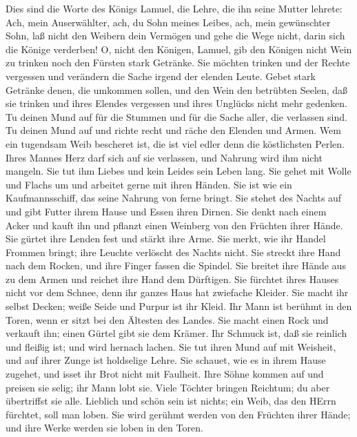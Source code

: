  Dies sind die Worte des Königs Lamuel, die Lehre, die ihn
seine Mutter lehrete:  Ach, mein Auserwählter, ach, du Sohn
meines Leibes, ach, mein gewünschter Sohn,  laß nicht den
Weibern dein Vermögen und gehe die Wege nicht, darin sich die Könige
verderben!  O, nicht den Königen, Lamuel, gib den Königen
nicht Wein zu trinken noch den Fürsten stark Getränke.  Sie
möchten trinken und der Rechte vergessen und verändern die Sache irgend
der elenden Leute.  Gebet stark Getränke denen, die umkommen
sollen, und den Wein den betrübten Seelen,  daß sie trinken
und ihres Elendes vergessen und ihres Unglücks nicht mehr gedenken.
 Tu deinen Mund auf für die Stummen und für die Sache aller,
die verlassen sind.  Tu deinen Mund auf und richte recht und
räche den Elenden und Armen.  Wem ein tugendsam Weib
bescheret ist, die ist viel edler denn die köstlichsten Perlen.
 Ihres Mannes Herz darf sich auf sie verlassen, und Nahrung
wird ihm nicht mangeln.  Sie tut ihm Liebes und kein Leides
sein Leben lang.  Sie gehet mit Wolle und Flachs um und
arbeitet gerne mit ihren Händen.  Sie ist wie ein
Kaufmannsschiff, das seine Nahrung von ferne bringt.  Sie
stehet des Nachts auf und gibt Futter ihrem Hause und Essen ihren
Dirnen.  Sie denkt nach einem Acker und kauft ihn und
pflanzt einen Weinberg von den Früchten ihrer Hände.  Sie
gürtet ihre Lenden fest und stärkt ihre Arme.  Sie merkt,
wie ihr Handel Frommen bringt; ihre Leuchte verlöscht des Nachts nicht.
 Sie streckt ihre Hand nach dem Rocken, und ihre Finger
fassen die Spindel.  Sie breitet ihre Hände aus zu dem
Armen und reichet ihre Hand dem Dürftigen.  Sie fürchtet
ihres Hauses nicht vor dem Schnee, denn ihr ganzes Haus hat zwiefache
Kleider.  Sie macht ihr selbst Decken; weiße Seide und
Purpur ist ihr Kleid.  Ihr Mann ist berühmt in den Toren,
wenn er sitzt bei den Ältesten des Landes.  Sie macht einen
Rock und verkauft ihn; einen Gürtel gibt sie dem Krämer. 
Ihr Schmuck ist, daß sie reinlich und fleißig ist; und wird hernach
lachen.  Sie tut ihren Mund auf mit Weisheit, und auf ihrer
Zunge ist holdselige Lehre.  Sie schauet, wie es in ihrem
Hause zugehet, und isset ihr Brot nicht mit Faulheit.  Ihre
Söhne kommen auf und preisen sie selig; ihr Mann lobt sie. 
Viele Töchter bringen Reichtum; du aber übertriffst sie alle.
 Lieblich und schön sein ist nichts; ein Weib, das den
HErrn fürchtet, soll man loben.  Sie wird gerühmt werden
von den Früchten ihrer Hände; und ihre Werke werden sie loben in den
Toren.
